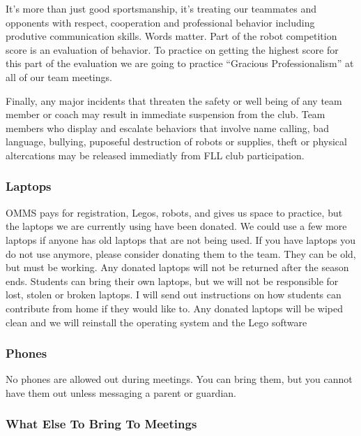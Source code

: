 It's more than just good sportsmanship, it's treating our teammates and
opponents with respect, cooperation and professional behavior including
produtive communication skills. Words matter. Part of the robot
competition score is an evaluation of behavior. To practice on getting
the highest score for this part of the evaluation we are going to
practice ``Gracious Professionalism'' at all of our team meetings.

Finally, any major incidents that threaten the safety or well being of
any team member or coach may result in immediate suspension from the
club. Team members who display and escalate behaviors that involve name
calling, bad language, bullying, puposeful destruction of robots or
supplies, theft or physical altercations may be released immediatly from
FLL club participation.

\hypertarget{laptops}{%
\subsubsection{Laptops}\label{laptops}}

OMMS pays for registration, Legos, robots, and gives us space to
practice, but the laptops we are currently using have been donated. We
could use a few more laptops if anyone has old laptops that are not
being used. If you have laptops you do not use anymore, please consider
donating them to the team. They can be old, but must be working. Any
donated laptops will not be returned after the season ends. Students can
bring their own laptops, but we will not be responsible for lost, stolen
or broken laptops. I will send out instructions on how students can
contribute from home if they would like to. Any donated laptops will be
wiped clean and we will reinstall the operating system and the Lego
software

\hypertarget{phones}{%
\subsubsection{Phones}\label{phones}}

No phones are allowed out during meetings. You can bring them, but you
cannot have them out unless messaging a parent or guardian.

\hypertarget{what-else-to-bring-to-meetings}{%
\subsubsection{What Else To Bring To
Meetings}\label{what-else-to-bring-to-meetings}}


